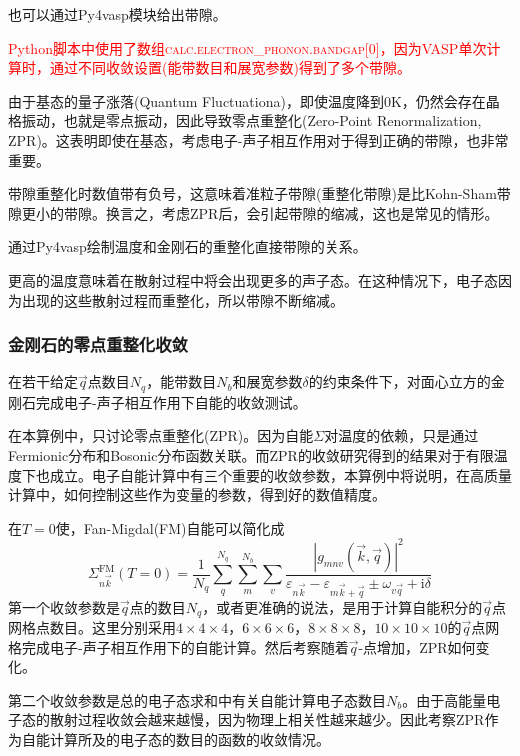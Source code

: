 也可以通过\textrm{Py4vasp}模块给出带隙。

\textcolor{red}{\textrm{Python}脚本中使用了数组\textsc{calc.electron\_phonon.bandgap[0]}，因为\textrm{VASP}单次计算时，通过不同收敛设置(能带数目和展宽参数)得到了多个带隙。}

由于基态的量子涨落\textrm{(Quantum Fluctuationa)}，即使温度降到\textrm{0K}，仍然会存在晶格振动，也就是零点振动，因此导致零点重整化\textrm{(Zero-Point Renormalization, ZPR)}。这表明即使在基态，考虑电子-声子相互作用对于得到正确的带隙，也非常重要。

带隙重整化时数值带有负号，这意味着准粒子带隙(重整化带隙)是比\textrm{Kohn-Sham}带隙更小的带隙。换言之，考虑\textrm{ZPR}后，会引起带隙的缩减，这也是常见的情形。

通过\textrm{Py4vasp}绘制温度和金刚石的重整化直接带隙的关系。

更高的温度意味着在散射过程中将会出现更多的声子态。在这种情况下，电子态因为出现的这些散射过程而重整化，所以带隙不断缩减。

\subsubsection{金刚石的零点重整化收敛}
在若干给定$\vec q$点数目$N_q$，能带数目$N_b$和展宽参数$\delta$的约束条件下，对面心立方的金刚石完成电子-声子相互作用下自能的收敛测试。

在本算例中，只讨论零点重整化\textrm{(ZPR)}。因为自能$\Sigma$对温度的依赖，只是通过\textrm{Fermionic}分布和\textrm{Bosonic}分布函数关联。而\textrm{ZPR}的收敛研究得到的结果对于有限温度下也成立。电子自能计算中有三个重要的收敛参数，本算例中将说明，在高质量计算中，如何控制这些作为变量的参数，得到好的数值精度。

在$T=0$使，\textrm{Fan-Migdal(FM)}自能可以简化成
\begin{displaymath}
	\Sigma_{n\vec k}^{\mathrm{FM}}(T=0)=\dfrac1{N_q}\sum_q^{N_q}\sum_m^{N_b}\sum_v\dfrac{|g_{mnv}(\vec k,\vec q)|^2}{\varepsilon_{n\vec k}-\varepsilon_{m\vec k+\vec q}\pm\omega_{v\vec q}+\mathrm{i}\delta}
\end{displaymath}
第一个收敛参数是$\vec q$点的数目$N_q$，或者更准确的说法，是用于计算自能积分的$\vec q$点网格点数目。这里分别采用$4\times4\times4$，$6\times6\times6$，$8\times8\times8$，$10\times10\times10$的$\vec q$点网格完成电子-声子相互作用下的自能计算。然后考察随着$\vec q$-点增加，\textrm{ZPR}如何变化。

第二个收敛参数是总的电子态求和中有关自能计算电子态数目$N_b$。由于高能量电子态的散射过程收敛会越来越慢，因为物理上相关性越来越少。因此考察\textrm{ZPR}作为自能计算所及的电子态的数目的函数的收敛情况。

